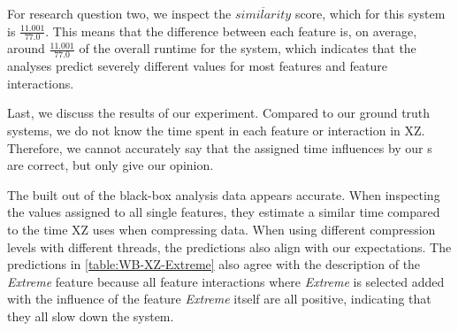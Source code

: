 For research question two, we inspect the $\overline{similarity}$ score, which for this system is $\frac{11.001}{77.0}$.
This means that the difference between each feature is, on average, around $\frac{11.001}{77.0}$ of the overall runtime for the system,
which indicates that the analyses predict severely different values for most features and feature interactions.

Last, we discuss the results of our experiment. Compared to our ground truth systems, 
we do not know the time spent in each feature or interaction in \textsc{XZ}. 
Therefore, we cannot accurately say that the assigned time influences by our {\perfInfluenceModel}s are correct, but only give our opinion.

The {\perfInfluenceModel} built out of the black-box analysis data appears accurate. 
When inspecting the values assigned to all single features, they estimate a similar time compared to the time \textsc{XZ} uses when compressing data. 
When using different compression levels with different threads, the predictions also align with our expectations.
The predictions in \autoref{table:WB-XZ-Extreme} also agree with the description of the \emph{Extreme} feature because
all feature interactions where \emph{Extreme} is selected added with the influence of the feature \emph{Extreme} itself are all positive,
indicating that they all slow down the system. 

